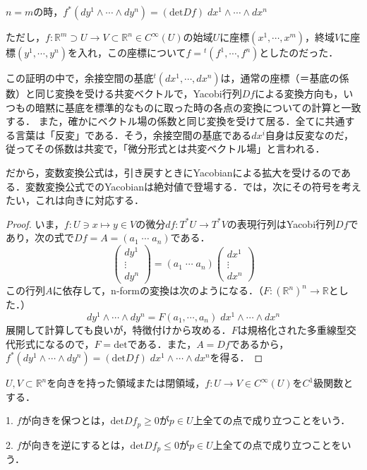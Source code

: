\documentclass[uplatex, dvipdfmx]{jsreport}
\begin{document}
\begin{lemma}[変数変換公式]
    $n=m$の時，$f^*(dy^1\wedge\cdots\wedge dy^n)=(\mathrm{det}Df)\;dx^1\wedge\cdots\wedge dx^n$

    ただし，$f:\mathbb{R}^m\supset U\to V\subset\mathbb{R}^n\in C^\infty(U)$の始域$U$に座標$(x^1,\cdots,x^m)$，終域$V$に座標$(y^1,\cdots,y^n)$を入れ，この座標について$f={}^t(f^1,\cdots,f^n)$としたのだった．
\end{lemma}
\begin{remark}
    この証明の中で，余接空間の基底${}^t(dx^1,\cdots,dx^n)$は，通常の座標（＝基底の係数）と同じ変換を受ける共変ベクトルで，Yacobi行列$Df$による変換方向も，いつもの暗黙に基底を標準的なものに取った時の各点の変換についての計算と一致する．
    また，確かにベクトル場の係数と同じ変換を受けて居る．全てに共通する言葉は「反変」である．そう，余接空間の基底である$dx^i$自身は反変なのだ，従ってその係数は共変で，「微分形式とは共変ベクトル場」と言われる．

    だから，変数変換公式は，引き戻すときにYacobianによる拡大を受けるのである．変数変換公式でのYacobianは絶対値で登場する．では，次にその符号を考えたい，これは向きに対応する．
\end{remark}
\begin{proof}
    いま，$f:U\ni x\mapsto y\in V$の微分$df:T^*U\to T^*V$の表現行列はYacobi行列$Df$であり，次の式で$Df=A=(a_1\;\cdots\;a_n)$である．
    \[ \begin{pmatrix}dy^1\\\vdots\\dy^n\end{pmatrix} = (a_1\;\cdots\;a_n)\begin{pmatrix}dx^1\\\vdots\\dx^n\end{pmatrix} \]
    この行列$A$に依存して，n-formの変換は次のようになる．（$F:(\mathbb{R}^n)^n\to\mathbb{R}$とした．）
    \[ dy^1\wedge\cdots\wedge dy^n = F(a_1,\cdots,a_n)\;dx^1\wedge\cdots\wedge dx^n \]
    展開して計算しても良いが，特徴付けから攻める．$F$は規格化された多重線型交代形式になるので，$F=\mathrm{det}$である．また，$A=Df$であるから，$f^*(dy^1\wedge\cdots\wedge dy^n)=(\mathrm{det}Df)\;dx^1\wedge\cdots\wedge dx^n$を得る．
\end{proof}

\begin{definition}
    $U,V\subset\mathbb{R}^n$を向きを持った領域または閉領域，$f:U\to V\in C^\infty(U)$を$C^1$級関数とする．

    1. $f$が向きを保つとは，$\mathrm{det}Df_p\ge 0$が$p\in U$上全ての点で成り立つことをいう．

    2. $f$が向きを逆にするとは，$\mathrm{det}Df_p\le 0$が$p\in U$上全ての点で成り立つことをいう．
\end{definition}
\end{document}
